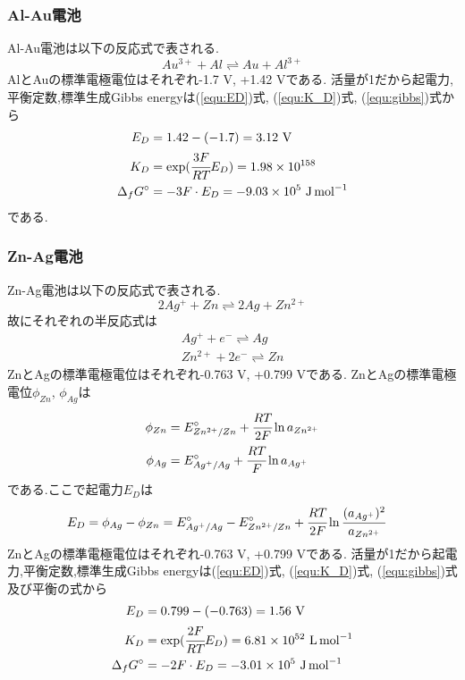 \subsubsection{Al-Au電池}
Al-Au電池は以下の反応式で表される.
\begin{equation*}
  Au^{3+}+Al\rightleftharpoons Au+Al^{3+}
\end{equation*}
AlとAuの標準電極電位はそれぞれ-1.7 \si{\volt}, +1.42 \si{\volt}である.
活量が1だから起電力,平衡定数,標準生成Gibbs energyは(\ref{equ:ED})式, (\ref{equ:K_D})式, (\ref{equ:gibbs})式から
\begin{align*}
  E_D&=1.42-(-1.7)=3.12\ \si{\volt}\\
  K_D&=\exp(\cfrac{3F}{RT}E_D)=1.98\times10^{158}\\
  \Delta_fG^{\circ}&=-3F\cdot E_D=-9.03\times10^5\ \si{\joule.\mole^{-1}}
\end{align*}
である.
\subsubsection{Zn-Ag電池}
Zn-Ag電池は以下の反応式で表される.
\begin{equation}
  2Ag^+ + Zn \rightleftharpoons 2Ag + Zn^{2+}
\end{equation}
故にそれぞれの半反応式は
\begin{align}
  Ag^+ + e^- \rightleftharpoons Ag\\
  Zn^{2+} + 2e^{-} \rightleftharpoons Zn
\end{align}
ZnとAgの標準電極電位はそれぞれ-0.763 \si{\volt}, +0.799 \si{\volt}である.
ZnとAgの標準電極電位$\phi_{Zn}$, $\phi_{Ag}$は
\begin{align}
  \phi_{Zn}&=E^{\circ}_{Zn^{2+}/Zn}+\cfrac{RT}{2F}\ln a_{Zn^{2+}}\\
  \phi_{Ag}&=E^{\circ}_{Ag^{+}/Ag}+\cfrac{RT}{F}\ln a_{Ag^{+}}
\end{align}
である.ここで起電力$E_D$は
\begin{align}
  E_D&=\phi_{Ag}-\phi_{Zn}=E^{\circ}_{Ag^{+}/Ag}-E^{\circ}_{Zn^{2+}/Zn}+\cfrac{RT}{2F} \ln \cfrac{(a_{Ag^+})^2}{a_{Zn^{2+}}}
\end{align}
ZnとAgの標準電極電位はそれぞれ-0.763 \si{\volt}, +0.799 \si{\volt}である.
活量が1だから起電力,平衡定数,標準生成Gibbs energyは(\ref{equ:ED})式, (\ref{equ:K_D})式, (\ref{equ:gibbs})式及び平衡の式から
\begin{align*}
  E_D&=0.799-(-0.763)=1.56\ \si{\volt}\\
  K_D&=\exp(\cfrac{2F}{RT}E_D)=6.81\times10^{52}\ \si{L.\mole^{-1}}\\
  \Delta_fG^{\circ}&=-2F\cdot E_D=-3.01\times10^5\ \si{\joule.\mole^{-1}}
\end{align*}


